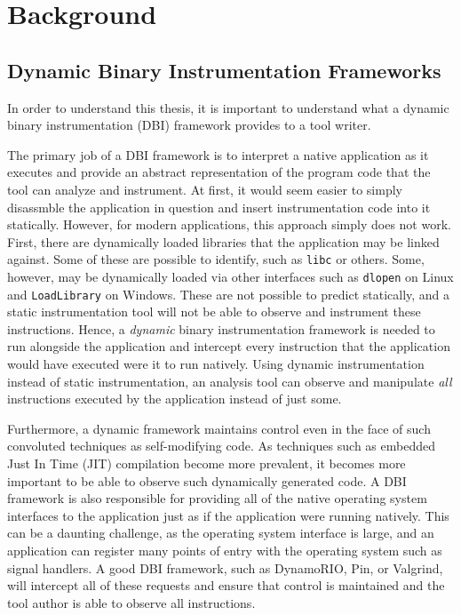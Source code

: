 \chapter{Background}
\label{sec:background}


\section{Dynamic Binary Instrumentation Frameworks}

In order to understand this thesis, it is important to understand what a dynamic
binary instrumentation (DBI) framework provides to a tool writer.

The primary job of a DBI framework is to interpret a native application as it
executes and provide an abstract representation of the program code that the
tool can analyze and instrument.  At first, it would seem easier to simply
disassmble the application in question and insert instrumentation code into it
statically.  However, for modern applications, this approach simply does not
work.  First, there are dynamically loaded libraries that the application may be
linked against.  Some of these are possible to identify, such as {\tt libc} or
others.  Some, however, may be dynamically loaded via other interfaces such as
{\tt dlopen} on Linux and {\tt LoadLibrary} on Windows.  These are not possible
to predict statically, and a static instrumentation tool will not be able to
observe and instrument these instructions.  Hence, a {\em dynamic} binary
instrumentation framework is needed to run alongside the application and
intercept every instruction that the application would have executed were it to
run natively.  Using dynamic instrumentation instead of static instrumentation,
an analysis tool can observe and manipulate {\em all} instructions executed by
the application instead of just some.

Furthermore, a dynamic framework maintains control even in the face of such
convoluted techniques as self-modifying code.  As techniques such as embedded
Just In Time (JIT) compilation become more prevalent, it becomes more important
to be able to observe such dynamically generated code.  A DBI framework is also
responsible for providing all of the native operating system interfaces to the
application just as if the application were running natively.  This can be a
daunting challenge, as the operating system interface is large, and an
application can register many points of entry with the operating system such as
signal handlers.  A good DBI framework, such as DynamoRIO, Pin, or Valgrind,
will intercept all of these requests and ensure that control is maintained and
the tool author is able to observe all instructions.

